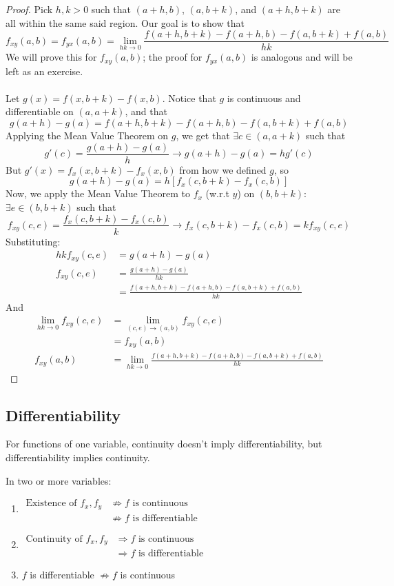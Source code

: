 \documentclass[12pt]{article}
\begin{document}
\begin{proof}
Pick $h,k>0$ such that $(a+h,b)$, $(a,b+k)$, and $(a+h,b+k)$ are all within the same said region. Our goal is to show that \[ f_{xy}(a,b) = f_{yx}(a,b) = \lim_{hk \rightarrow 0}{\frac{f(a+h,b+k) - f(a+h,b) - f(a,b+k) + f(a,b)}{hk}} \]
We will prove this for $f_{xy}(a,b)$; the proof for $f_{yx}(a,b)$ is analogous and will be left as an exercise. \\ \\
Let $g(x) = f(x,b+k) - f(x,b)$. Notice that $g$ is continuous and differentiable on $(a,a+k)$, and that \[ g(a+h) - g(a) = f(a+h,b+k) - f(a+h,b) - f(a,b+k) + f(a,b) \]
Applying the Mean Value Theorem on $g$, we get that $\exists c \in (a,a+k)$ such that \[ g'(c) = \frac{g(a+h) - g(a)}{h} \rightarrow g(a+h) - g(a) = hg'(c) \]
But $g'(x) = f_x(x,b+k) - f_x(x,b)$ from how we defined $g$, so \[ g(a+h) - g(a) = h[f_x(c,b+k) - f_x(c,b)] \]
Now, we apply the Mean Value Theorem to $f_x$ (w.r.t $y$) on $(b,b+k)$: $\exists e \in (b,b+k)$ such that \[ f_{xy}(c,e) = \frac{f_x(c,b+k) - f_x(c,b)}{k} \rightarrow f_x(c,b+k) - f_x(c,b) = kf_{xy}(c,e) \]
Substituting: 
\[ 
\begin{aligned} 
hkf_{xy}(c,e) &= g(a+h) - g(a) \\ 
f_{xy}(c,e) &= \frac{g(a+h) - g(a)}{hk} \\
&= \frac{f(a+h,b+k) - f(a+h,b) - f(a,b+k) + f(a,b)}{hk} \end{aligned} \]
And \[ 
\begin{aligned}
\lim_{hk \rightarrow 0}{f_{xy}(c,e)} &= \lim_{(c,e) \rightarrow (a,b)}{f_{xy}(c,e)} \\
&= f_{xy}(a,b) \\
f_{xy}(a,b) &= \lim_{hk \rightarrow 0} {\frac{f(a+h,b+k) - f(a+h,b) - f(a,b+k) + f(a,b)}{hk}} 
\end{aligned} \]
\end{proof}

\subsection{Differentiability}
For functions of one variable, continuity doesn't imply differentiability, but differentiability implies continuity.

In two or more variables:
\begin{enumerate}
\item $
\begin{aligned}
\text{Existence of } f_x,f_y &\not \Rightarrow f \text{ is continuous} \\
&\not \Rightarrow f \text{ is differentiable}
\end{aligned}$
\item $
\begin{aligned}
\text{Continuity of } f_x,f_y &\Rightarrow f \text{ is continuous} \\ 
&\Rightarrow f \text{ is differentiable}
\end{aligned}
$

\item $f$ is differentiable $\not \Rightarrow f$ is continuous 
\end{enumerate}
\end{document}
